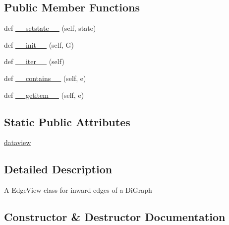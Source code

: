 \subsection*{Public Member Functions}
\begin{DoxyCompactItemize}
\item 
def \hyperlink{classnetworkx_1_1classes_1_1reportviews_1_1InEdgeView_a2d6758599f027a55bff1b0e278e0af7d}{\+\_\+\+\_\+setstate\+\_\+\+\_\+} (self, state)
\item 
def \hyperlink{classnetworkx_1_1classes_1_1reportviews_1_1InEdgeView_a8b42609e88425919f693f8905b3a227d}{\+\_\+\+\_\+init\+\_\+\+\_\+} (self, G)
\item 
def \hyperlink{classnetworkx_1_1classes_1_1reportviews_1_1InEdgeView_a0706daa82a88ebdaf6e7799fa2306eed}{\+\_\+\+\_\+iter\+\_\+\+\_\+} (self)
\item 
def \hyperlink{classnetworkx_1_1classes_1_1reportviews_1_1InEdgeView_a0a60afb6a21f51ee3b76a603992079ff}{\+\_\+\+\_\+contains\+\_\+\+\_\+} (self, e)
\item 
def \hyperlink{classnetworkx_1_1classes_1_1reportviews_1_1InEdgeView_ae22b009053b0fc2b89490f846929f337}{\+\_\+\+\_\+getitem\+\_\+\+\_\+} (self, e)
\end{DoxyCompactItemize}
\subsection*{Static Public Attributes}
\begin{DoxyCompactItemize}
\item 
\hyperlink{classnetworkx_1_1classes_1_1reportviews_1_1InEdgeView_a74d5794b64a1f963f1c9e25a307a8b80}{dataview}
\end{DoxyCompactItemize}


\subsection{Detailed Description}
\begin{DoxyVerb}A EdgeView class for inward edges of a DiGraph\end{DoxyVerb}
 

\subsection{Constructor \& Destructor Documentation}
\mbox{\label{classnetworkx_1_1classes_1_1reportviews_1_1InEdgeView_a8b42609e88425919f693f8905b3a227d}} 
